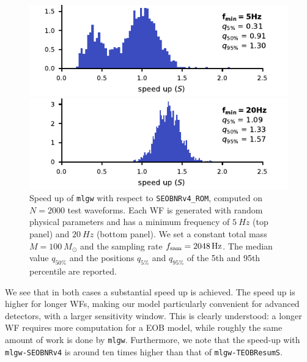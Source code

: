 \documentclass[twocolumn,showpacs,preprintnumbers,nofootinbib,prd,
superscriptaddress,10pt]{revtex4-1}
\begin{document}
\begin{figure}
	\centering
	\begin{minipage}{\factor\linewidth}
	    \includegraphics[width=\linewidth]{img/time_performance_hist_ROM_5_2048.pdf}
	\end{minipage}\hfill
	\begin{minipage}{\factor\linewidth}
	    \includegraphics[width=\linewidth]{img/time_performance_hist_ROM_20_2048.pdf}
	\end{minipage}

	\caption{
	Speed up of \texttt{mlgw} with respect to \texttt{SEOBNRv4\_ROM}, computed on $N=2000$ test waveforms.
	Each WF is generated with random physical 
	parameters and has a minimum frequency of $\SI{5}{Hz}$ (top panel) and $\SI{20}{Hz}$ (bottom panel).
	We set a constant total mass $M=\SI{100}{M_\odot}$ and the sampling rate $f_{\rm sam} = \SI{2048}{Hz}$.
	The median value $q_{50\%}$ and the positions $q_{5\%}$ and $q_{95\%}$ of the 5th and 95th percentile are reported.
}
	\label{fig:time_performance_hist_ROM}
\end{figure}

We see that in both cases a substantial speed up is achieved. The speed up is higher for longer WFs, 
making our model particularly convenient 
for advanced detectors, with a larger sensitivity window.
This is clearly understood: a longer WF requires more computation for a EOB model, while 
roughly the same amount of work is done by \texttt{mlgw}.
Furthermore, we note that the speed-up with \texttt{mlgw-SEOBNRv4} is around ten times 
higher than that of \texttt{mlgw-TEOBResumS}. 
\end{document}
